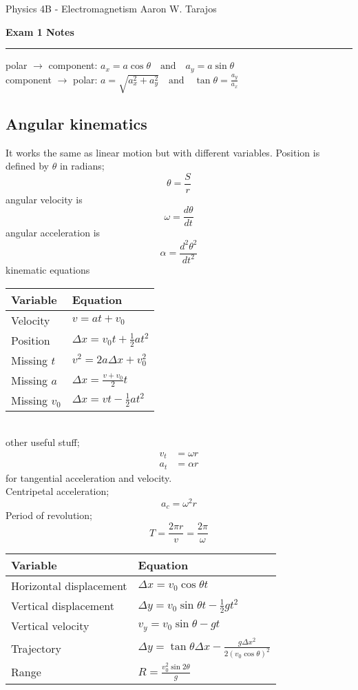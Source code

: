 \documentclass{article}
\begin{document}
\noindent
Physics 4B - Electromagnetism \hfill Aaron W. Tarajos
\begin{center}
	\textbf{Exam 1 Notes}
\end{center}

\noindent\rule{\textwidth}{0.4pt}

\begin{multicols}{2}
\flushleft
polar $\to$ component: $a_x = a\cos\theta \quad \text{and} \quad a_y = a\sin\theta$\\
component $\to$ polar: $a = \sqrt{a_x^2 + a_y^2} \quad \text{and} \quad \tan\theta = \frac{a_y}{a_x}$

\subsection*{Angular kinematics}
It works the same as linear motion but with different variables. Position is defined by $\theta$ in radians;
\[
	\theta = \frac{S}{r}
\]
angular velocity is
\[
	\omega = \frac{d\theta}{dt}
\]
angular acceleration is
\[
	\alpha = \frac{d^2\theta^2}{dt^2}
\]
kinematic equations \\
    \begin{tabular}{|l|l|}
        \hline
        Variable & Equation \\
        \hline
        Velocity & $v = at + v_0$ \\
        Position & $\Delta x = v_0t + \frac{1}{2}at^2$ \\
        Missing $t$ & $v^2 = 2a\Delta x + v_0^2$ \\
        Missing $a$ & $\Delta x = \frac{v +v_0}{2}t$ \\
        Missing $v_0$ & $\Delta x = vt - \frac{1}{2}at^2$ \\
        \hline
    \end{tabular}\\
other useful stuff;
\begin{align*}
	v_t &= \omega r \\
	a_t &= \alpha r
\end{align*}
for tangential acceleration and velocity. \\
Centripetal acceleration;
\[
	a_c = \omega^2 r
\]
Period of revolution;
\[
	T = \frac{2 \pi r}{v} = \frac{2 \pi}{\omega}
\]

\begin{tabular}{|l|l|}
	\hline
	Variable & Equation \\
	\hline
	Horizontal displacement & $\Delta x = v_0 \cos \theta t$ \\
	Vertical displacement & $\Delta y = v_0 \sin \theta t - \frac{1}{2}gt^2$ \\
	Vertical velocity & $v_y = v_0 \sin \theta - gt$ \\
	Trajectory & $\Delta y = \tan \theta \Delta x - \frac{g \Delta x^2}{2(v_0\cos \theta)^2}$ \\
	Range & $R = \frac{v_0^2 \sin 2\theta}{g}$ \\
	\hline
\end{tabular}



\end{multicols}
\end{document}
